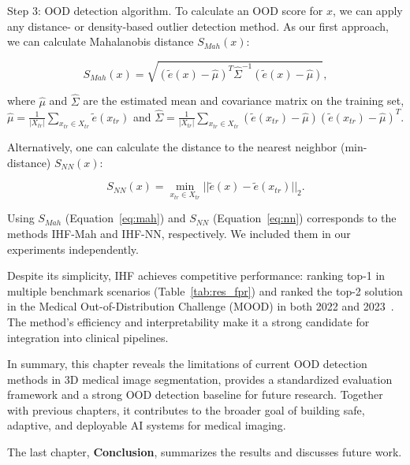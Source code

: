 Step 3: OOD detection algorithm. To calculate an OOD score for $x$, we can apply any distance- or density-based outlier detection method. As our first approach, we can calculate Mahalanobis distance $S_{Mah}(x)$:

\begin{equation}
	\label{eq:mah}
	S_{Mah}(x) = \sqrt{ \left( \tilde{e}(x) - \hat{\mu} \right)^T \hat{\Sigma}^{-1} \left( \tilde{e}(x) - \hat{\mu} \right) },
\end{equation}

\noindent
where $\hat{\mu}$ and $\hat{\Sigma}$ are the estimated mean and covariance matrix on the training set, $\hat{\mu} = \frac{1}{|X_{tr}|} \sum_{x_{tr} \in X_{tr}} \tilde{e} \left(x_{tr}\right)$ and $\hat{\Sigma} = \frac{1}{|X_{tr}|} \sum_{x_{tr} \in X_{tr}} \left( \tilde{e} (x_{tr}) - \hat{\mu} \right) \left( \tilde{e} (x_{tr}) - \hat{\mu} \right)^T$.

Alternatively, one can calculate the distance to the nearest neighbor (min-distance) $S_{NN}(x)$:

\begin{equation}
	\label{eq:nn}
	S_{NN}(x) = \min_{x_{tr} \in X_{tr}} || \tilde{e} (x) - \tilde{e} (x_{tr}) ||_2.
\end{equation}

Using $S_{Mah}$ (Equation~\ref{eq:mah}) and $S_{NN}$ (Equation~\ref{eq:nn}) corresponds to the methods IHF-Mah and IHF-NN, respectively. We included them in our experiments independently.

Despite its simplicity, IHF achieves competitive performance: ranking top-1 in multiple benchmark scenarios (Table~\ref{tab:res_fpr}) and ranked the top-2 solution in the Medical Out-of-Distribution Challenge (MOOD) in both 2022 and 2023~\cite{zimmerer2022mood}. The method’s efficiency and interpretability make it a strong candidate for integration into clinical pipelines.



In summary, this chapter reveals the limitations of current OOD detection methods in 3D medical image segmentation, provides a standardized evaluation framework and a strong OOD detection baseline for future research. Together with previous chapters, it contributes to the broader goal of building safe, adaptive, and deployable AI systems for medical imaging.



The last chapter, \textbf{Conclusion}, summarizes the results and discusses future work.

